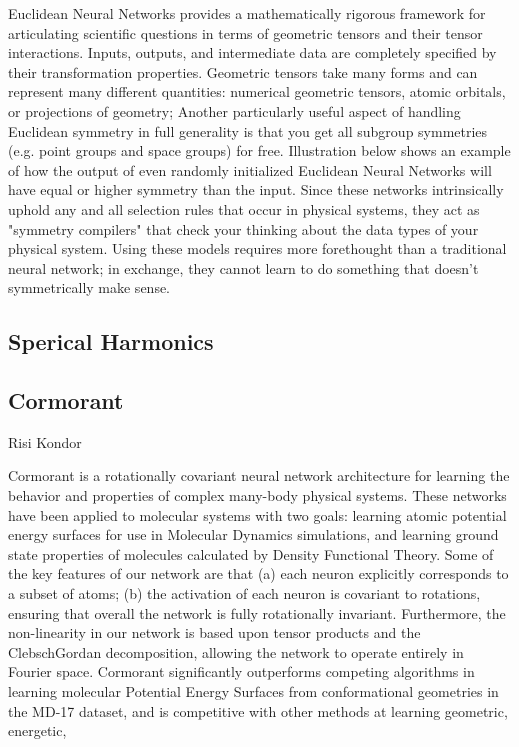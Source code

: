 \documentclass[book.tex]{subfiles}
\begin{document}
Euclidean Neural Networks provides a mathematically rigorous framework for articulating scientific questions in terms of geometric tensors and their tensor interactions. Inputs, outputs, and intermediate data are completely specified by their transformation properties. Geometric tensors take many forms and can represent many different quantities: numerical geometric tensors, atomic orbitals, or projections of geometry; Another particularly useful aspect of handling Euclidean symmetry in full generality is that you get all subgroup symmetries (e.g. point groups and space groups) for free. Illustration below shows an example of how the output of even randomly initialized Euclidean Neural Networks will have equal or higher symmetry than the input. Since these networks intrinsically uphold any and all selection rules that occur in physical systems, they act
as "symmetry compilers" that check your thinking about the data types of your physical system. Using these models requires more forethought than a traditional neural network; in exchange, they cannot learn to do something that doesn't symmetrically make sense.

\subsection{Sperical Harmonics}

\subsection{Cormorant}

Risi Kondor

Cormorant is a rotationally covariant neural network architecture for
learning the behavior and properties of complex many-body physical systems.
These networks have been applied to molecular systems with two goals: learning atomic
potential energy surfaces for use in Molecular Dynamics simulations, and learning ground state properties of molecules calculated by Density Functional Theory.
Some of the key features of our network are that (a) each neuron explicitly corresponds to a subset of atoms; (b) the activation of each neuron is covariant to rotations, ensuring that overall the network is fully rotationally invariant. Furthermore, the non-linearity in our network is based upon tensor products and the ClebschGordan decomposition, allowing the network to operate entirely in Fourier space. Cormorant significantly outperforms competing algorithms in learning molecular Potential Energy Surfaces from conformational geometries in the MD-17 dataset, and is competitive with other methods at learning geometric, energetic,
\end{document}

